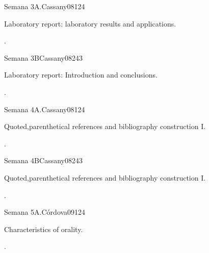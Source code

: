 \begin{syllabus}
\begin{unit}{}{Semana 3A.}{Cassany08}{12}{4}
   \begin{topics}
      \item Laboratory report: laboratory results and applications. 
   \end{topics}
   \begin{learningoutcomes}
      \item .
   \end{learningoutcomes}
\end{unit}

\begin{unit}{}{Semana 3B}{Cassany08}{24}{3}
   \begin{topics}
      \item Laboratory report: Introduction and conclusions. 
   \end{topics}

   \begin{learningoutcomes}
      \item .
      \end{learningoutcomes}
\end{unit}

\begin{unit}{}{Semana 4A.}{Cassany08}{12}{4}
   \begin{topics}
      \item Quoted,parenthetical references and bibliography construction I. 
   \end{topics}
   \begin{learningoutcomes}
      \item .
   \end{learningoutcomes}
\end{unit}

\begin{unit}{}{Semana 4B}{Cassany08}{24}{3}
   \begin{topics}
      \item Quoted,parenthetical references and bibliography construction I.
   \end{topics}

   \begin{learningoutcomes}
      \item .
      \end{learningoutcomes}
\end{unit}


\begin{unit}{}{Semana 5A.}{Córdova09}{12}{4}
   \begin{topics}
      \item Characteristics of orality.
   \end{topics}
   \begin{learningoutcomes}
      \item .
   \end{learningoutcomes}
\end{unit}


\end{syllabus}

